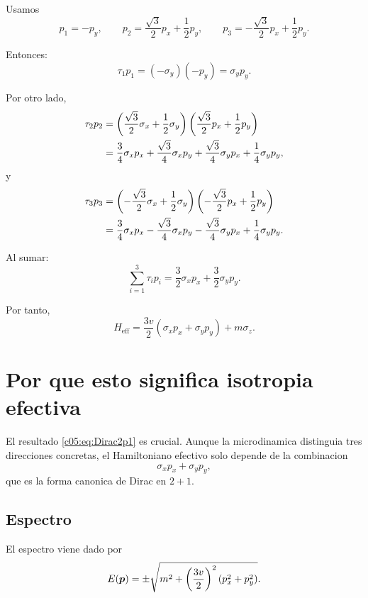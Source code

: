 Usamos
\begin{equation}
p_1 = -p_y,
\qquad
p_2 = \frac{\sqrt{3}}{2}p_x + \frac{1}{2}p_y,
\qquad
p_3 = -\frac{\sqrt{3}}{2}p_x + \frac{1}{2}p_y.
\label{c05:eq:pi}
\end{equation}

Entonces:
\begin{equation}
\tau_1 p_1 = (-\sigma_y)(-p_y)=\sigma_y p_y.
\end{equation}

Por otro lado,
\begin{align}
\tau_2 p_2
&=
\left(
\frac{\sqrt{3}}{2}\sigma_x + \frac{1}{2}\sigma_y
\right)
\left(
\frac{\sqrt{3}}{2}p_x + \frac{1}{2}p_y
\right)
\notag\\
&=
\frac{3}{4}\sigma_x p_x
+ \frac{\sqrt{3}}{4}\sigma_x p_y
+ \frac{\sqrt{3}}{4}\sigma_y p_x
+ \frac{1}{4}\sigma_y p_y,
\end{align}
y
\begin{align}
\tau_3 p_3
&=
\left(
-\frac{\sqrt{3}}{2}\sigma_x + \frac{1}{2}\sigma_y
\right)
\left(
-\frac{\sqrt{3}}{2}p_x + \frac{1}{2}p_y
\right)
\notag\\
&=
\frac{3}{4}\sigma_x p_x
- \frac{\sqrt{3}}{4}\sigma_x p_y
- \frac{\sqrt{3}}{4}\sigma_y p_x
+ \frac{1}{4}\sigma_y p_y.
\end{align}

Al sumar:
\begin{equation}
\sum_{i=1}^3 \tau_i p_i
=
\frac{3}{2}\sigma_x p_x + \frac{3}{2}\sigma_y p_y.
\label{c05:eq:keysum}
\end{equation}

Por tanto,
\begin{equation}
H_{\text{eff}}
=
\frac{3v}{2}\left(\sigma_x p_x + \sigma_y p_y\right)
+ m\sigma_z.
\label{c05:eq:Dirac2p1}
\end{equation}

\section{Por que esto significa isotropia efectiva}
El resultado \eqref{c05:eq:Dirac2p1} es crucial. Aunque la microdinamica distinguia tres direcciones concretas, el Hamiltoniano efectivo solo depende de la combinacion
\begin{equation}
\sigma_x p_x + \sigma_y p_y,
\end{equation}
que es la forma canonica de Dirac en \(2+1\).

\subsection{Espectro}
El espectro viene dado por
\begin{equation}
E(\bm{p})=\pm\sqrt{m^2+\left(\frac{3v}{2}\right)^2(p_x^2+p_y^2)}.
\label{c05:eq:disp}
\end{equation}

